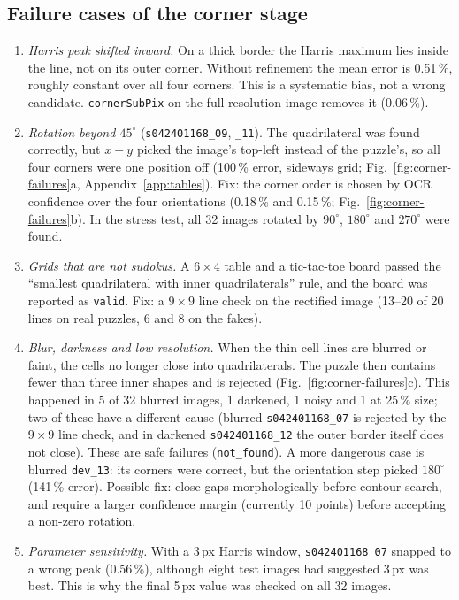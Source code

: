 \documentclass[conference]{IEEEtran}
\begin{document}
\subsection{Failure cases of the corner stage}
\begin{enumerate}
\item \emph{Harris peak shifted inward.} On a thick border the Harris maximum lies inside the line, not on its outer corner. Without refinement the mean error is 0.51\,\%, roughly constant over all four corners. This is a systematic bias, not a wrong candidate. \texttt{cornerSubPix} on the full-resolution image removes it (0.06\,\%).
\item \emph{Rotation beyond $45^\circ$} (\texttt{s042401168\_09}, \texttt{\_11}). The quadrilateral was found correctly, but $x+y$ picked the image's top-left instead of the puzzle's, so all four corners were one position off (100\,\% error, sideways grid; Fig.~\ref{fig:corner-failures}a, Appendix~\ref{app:tables}). Fix: the corner order is chosen by OCR confidence over the four orientations (0.18\,\% and 0.15\,\%; Fig.~\ref{fig:corner-failures}b). In the stress test, all 32 images rotated by $90^\circ$, $180^\circ$ and $270^\circ$ were found.
\item \emph{Grids that are not sudokus.} A $6\times4$ table and a tic-tac-toe board passed the ``smallest quadrilateral with inner quadrilaterals'' rule, and the board was reported as \texttt{valid}. Fix: a $9\times9$ line check on the rectified image (13--20 of 20 lines on real puzzles, 6 and 8 on the fakes).
\item \emph{Blur, darkness and low resolution.} When the thin cell lines are blurred or faint, the cells no longer close into quadrilaterals. The puzzle then contains fewer than three inner shapes and is rejected (Fig.~\ref{fig:corner-failures}c). This happened in 5 of 32 blurred images, 1 darkened, 1 noisy and 1 at 25\,\% size; two of these have a different cause (blurred \texttt{s042401168\_07} is rejected by the $9\times9$ line check, and in darkened \texttt{s042401168\_12} the outer border itself does not close). These are safe failures (\texttt{not\_found}). A more dangerous case is blurred \texttt{dev\_13}: its corners were correct, but the orientation step picked $180^\circ$ (141\,\% error). Possible fix: close gaps morphologically before contour search, and require a larger confidence margin (currently 10 points) before accepting a non-zero rotation.
\item \emph{Parameter sensitivity.} With a 3\,px Harris window, \texttt{s042401168\_07} snapped to a wrong peak (0.56\,\%), although eight test images had suggested 3\,px was best. This is why the final 5\,px value was checked on all 32 images.
\end{enumerate}
\end{document}
